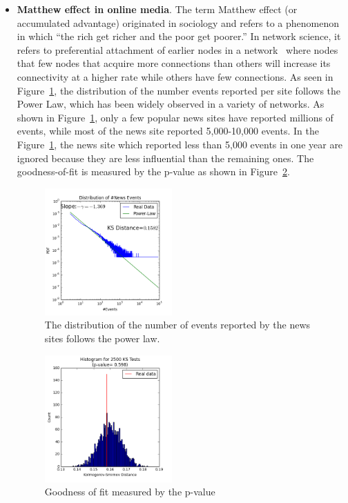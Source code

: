 \begin{itemize}
\item \textbf{Matthew effect in online media}.
The term  Matthew effect (or accumulated advantage) originated in sociology and refers to a phenomenon in which ``the rich get richer and the poor get poorer.'' In network science, it refers to preferential attachment of earlier nodes in a network~\cite{barabasi1999emergence} where nodes that few nodes that acquire more connections than others will increase its connectivity at a higher rate while others have few connections. As seen in Figure~\ref{fig:popularity}, the distribution of the number events reported per site follows the Power Law, which has been widely observed in a variety of networks. As shown in Figure~\ref{fig:popularity}, only a few popular news sites have reported millions of events, while most of the news site reported 5,000-10,000 events. In the Figure~\ref{fig:popularity}, the news site which reported less than 5,000 events in one year are ignored because they are less influential than the remaining ones. The goodness-of-fit is measured by the p-value as shown in Figure~\ref{fig:popularity_pvalue}.

\begin{figure}
\includegraphics[width=0.46\textwidth]{img/chap3/histo.png}
\centering
\caption{The distribution of the number of events reported by the news sites follows the power law.}\label{fig:popularity}
\end{figure}

\begin{figure}
\includegraphics[width=0.46\textwidth]{img/chap3/histo_pvalue.png}
\centering
\caption{Goodness of fit measured by the p-value}\label{fig:popularity_pvalue}
\end{figure}
\end{itemize}
    

